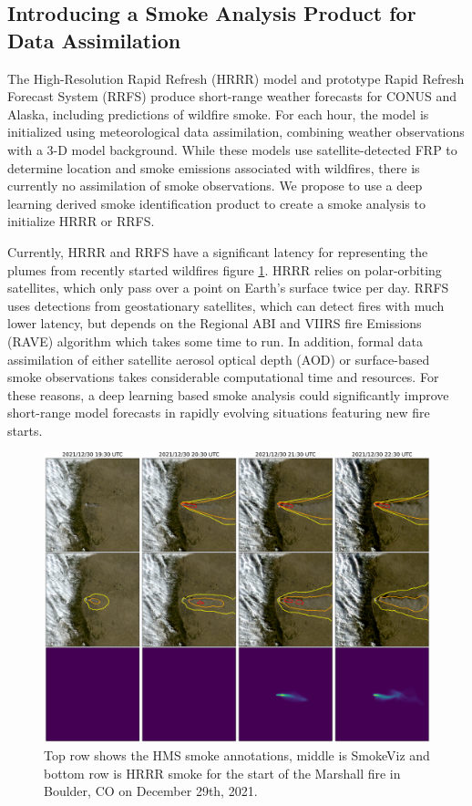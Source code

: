 \subsection{Introducing a Smoke Analysis Product for Data Assimilation}

The High-Resolution Rapid Refresh (HRRR) model and prototype Rapid Refresh Forecast System (RRFS) produce short-range weather forecasts for CONUS and Alaska, including predictions of wildfire smoke. For each hour, the model is initialized using meteorological data assimilation, combining weather observations with a 3-D model background. While these models use satellite-detected FRP to determine location and smoke emissions associated with wildfires, there is currently no assimilation of smoke observations. We propose to use a deep learning derived smoke identification product to create a smoke analysis to initialize HRRR or RRFS.  

Currently, HRRR and RRFS have a significant latency for representing the plumes from recently started wildfires figure \ref{marshall}.  HRRR relies on polar-orbiting satellites, which only pass over a point on Earth’s surface twice per day.  RRFS uses detections from geostationary satellites, which can detect fires with much lower latency, but depends on the Regional ABI and VIIRS fire Emissions (RAVE) algorithm which takes some time to run.  In addition, formal data assimilation of either satellite aerosol optical depth (AOD) or surface-based smoke observations takes considerable computational time and resources.  For these reasons, a deep learning based smoke analysis could significantly improve short-range model forecasts in rapidly evolving situations featuring new fire starts.  

\begin{figure}
    \centering
    \includegraphics[width=.8\linewidth]{figures/marshall.png}
    \caption{Top row shows the HMS smoke annotations, middle is SmokeViz and bottom row is HRRR smoke for the start of the Marshall fire in Boulder, CO on December 29th, 2021.}\label{marshall}
\end{figure}

